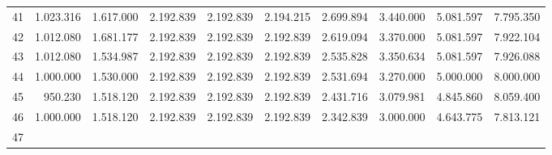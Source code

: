 \begin{tabular}{llllllllll}
\multicolumn{1}{l}{\hspace{1em}41} &
  \multicolumn{1}{|r}{1.023.316} &
  \multicolumn{1}{r}{1.617.000} &
  \multicolumn{1}{r}{2.192.839} &
  \multicolumn{1}{r}{2.192.839} &
  \multicolumn{1}{r}{2.194.215} &
  \multicolumn{1}{r}{2.699.894} &
  \multicolumn{1}{r}{3.440.000} &
  \multicolumn{1}{r}{5.081.597} &
  \multicolumn{1}{r}{7.795.350} \\
\multicolumn{1}{l}{\hspace{1em}42} &
  \multicolumn{1}{|r}{1.012.080} &
  \multicolumn{1}{r}{1.681.177} &
  \multicolumn{1}{r}{2.192.839} &
  \multicolumn{1}{r}{2.192.839} &
  \multicolumn{1}{r}{2.192.839} &
  \multicolumn{1}{r}{2.619.094} &
  \multicolumn{1}{r}{3.370.000} &
  \multicolumn{1}{r}{5.081.597} &
  \multicolumn{1}{r}{7.922.104} \\
\multicolumn{1}{l}{\hspace{1em}43} &
  \multicolumn{1}{|r}{1.012.080} &
  \multicolumn{1}{r}{1.534.987} &
  \multicolumn{1}{r}{2.192.839} &
  \multicolumn{1}{r}{2.192.839} &
  \multicolumn{1}{r}{2.192.839} &
  \multicolumn{1}{r}{2.535.828} &
  \multicolumn{1}{r}{3.350.634} &
  \multicolumn{1}{r}{5.081.597} &
  \multicolumn{1}{r}{7.926.088} \\
\multicolumn{1}{l}{\hspace{1em}44} &
  \multicolumn{1}{|r}{1.000.000} &
  \multicolumn{1}{r}{1.530.000} &
  \multicolumn{1}{r}{2.192.839} &
  \multicolumn{1}{r}{2.192.839} &
  \multicolumn{1}{r}{2.192.839} &
  \multicolumn{1}{r}{2.531.694} &
  \multicolumn{1}{r}{3.270.000} &
  \multicolumn{1}{r}{5.000.000} &
  \multicolumn{1}{r}{8.000.000} \\
\multicolumn{1}{l}{\hspace{1em}45} &
  \multicolumn{1}{|r}{950.230} &
  \multicolumn{1}{r}{1.518.120} &
  \multicolumn{1}{r}{2.192.839} &
  \multicolumn{1}{r}{2.192.839} &
  \multicolumn{1}{r}{2.192.839} &
  \multicolumn{1}{r}{2.431.716} &
  \multicolumn{1}{r}{3.079.981} &
  \multicolumn{1}{r}{4.845.860} &
  \multicolumn{1}{r}{8.059.400} \\
\multicolumn{1}{l}{\hspace{1em}46} &
  \multicolumn{1}{|r}{1.000.000} &
  \multicolumn{1}{r}{1.518.120} &
  \multicolumn{1}{r}{2.192.839} &
  \multicolumn{1}{r}{2.192.839} &
  \multicolumn{1}{r}{2.192.839} &
  \multicolumn{1}{r}{2.342.839} &
  \multicolumn{1}{r}{3.000.000} &
  \multicolumn{1}{r}{4.643.775} &
  \multicolumn{1}{r}{7.813.121} \\
\multicolumn{1}{l}{\hspace{1em}47} &

\end{tabular}
